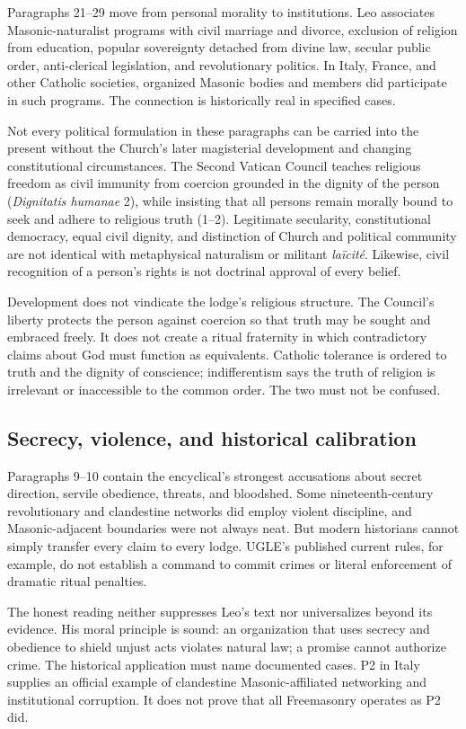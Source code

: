 Paragraphs 21--29 move from personal morality to institutions. Leo associates Masonic-naturalist programs with civil marriage and divorce, exclusion of religion from education, popular sovereignty detached from divine law, secular public order, anti-clerical legislation, and revolutionary politics. In Italy, France, and other Catholic societies, organized Masonic bodies and members did participate in such programs. The connection is historically real in specified cases.

Not every political formulation in these paragraphs can be carried into the present without the Church's later magisterial development and changing constitutional circumstances. The Second Vatican Council teaches religious freedom as civil immunity from coercion grounded in the dignity of the person (\emph{Dignitatis humanae} 2), while insisting that all persons remain morally bound to seek and adhere to religious truth (1--2). Legitimate secularity, constitutional democracy, equal civil dignity, and distinction of Church and political community are not identical with metaphysical naturalism or militant \emph{laïcité}. Likewise, civil recognition of a person's rights is not doctrinal approval of every belief.

Development does not vindicate the lodge's religious structure. The Council's liberty protects the person against coercion so that truth may be sought and embraced freely. It does not create a ritual fraternity in which contradictory claims about God must function as equivalents. Catholic tolerance is ordered to truth and the dignity of conscience; indifferentism says the truth of religion is irrelevant or inaccessible to the common order. The two must not be confused.

\subsection{Secrecy, violence, and historical calibration}

Paragraphs 9--10 contain the encyclical's strongest accusations about secret direction, servile obedience, threats, and bloodshed. Some nineteenth-century revolutionary and clandestine networks did employ violent discipline, and Masonic-adjacent boundaries were not always neat. But modern historians cannot simply transfer every claim to every lodge. UGLE's published current rules, for example, do not establish a command to commit crimes or literal enforcement of dramatic ritual penalties.

The honest reading neither suppresses Leo's text nor universalizes beyond its evidence. His moral principle is sound: an organization that uses secrecy and obedience to shield unjust acts violates natural law; a promise cannot authorize crime. The historical application must name documented cases. P2 in Italy supplies an official example of clandestine Masonic-affiliated networking and institutional corruption. It does not prove that all Freemasonry operates as P2 did.

